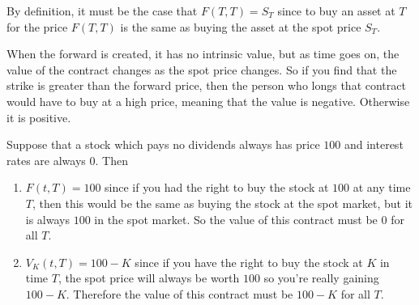 \documentclass{article}
\begin{document}
    \begin{lemma}
      \label{thm:forward-price-at-expiry}
      By definition, it must be the case that $F(T, T) = S_T$ since to buy an asset at $T$ for the price $F(T, T)$ is the same as buying the asset at the spot price $S_T$. 
    \end{lemma}

    When the forward is created, it has no intrinsic value, but as time goes on, the value of the contract changes as the spot price changes. So if you find that the strike is greater than the forward price, then the person who longs that contract would have to buy at a high price, meaning that the value is negative. Otherwise it is positive. 

    \begin{example}
      \label{ex:constant-stock}
      Suppose that a stock which pays no dividends always has price $100$ and interest rates are always $0$. Then 
      \begin{enumerate}
        \item $F(t, T) = 100$ since if you had the right to buy the stock at $100$ at any time $T$, then this would be the same as buying the stock at the spot market, but it is always $100$ in the spot market. So the value of this contract must be $0$ for all $T$. 
        \item $V_K (t, T) = 100 - K$ since if you have the right to buy the stock at $K$ in time $T$, the spot price will always be worth $100$ so you're really gaining $100 - K$. Therefore the value of this contract must be $100 - K$ for all $T$. 
      \end{enumerate}
    \end{example}
\end{document}
